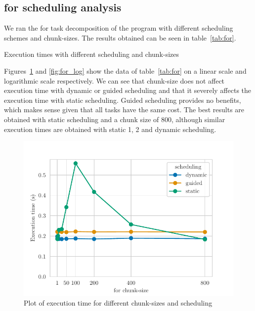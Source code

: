 \pagebreak
\subsection{for scheduling analysis}%
\label{ssec:for}

We ran the for task decomposition of the program with different scheduling schemes and chunk-sizes. The
results obtained can be seen in table~\ref{tab:for}.

\begin{table}[H]
    \caption{Execution times with different scheduling and chunk-sizes}%
    \label{tab:for}
    \begin{center}
    
    \end{center}
\end{table}

Figures~\ref{fig:for} and \ref{fig:for_log} show the data of table~\ref{tab:for} on a linear scale and logarithmic
scale respectively. We can see that chunk-size does not affect execution time with dynamic or guided scheduling
and that it severely affects the execution time with static scheduling. Guided scheduling provides no benefits, which
makes sense given that all tasks have the same cost. The best results are obtained with static scheduling and
a chunk size of 800, although similar execution times are obtained with static 1, 2 and dynamic scheduling.


\begin{figure}[H]
    \centering
    \includegraphics{plots/for-scheduling.pdf}
    \caption{Plot of execution time for different chunk-sizes and scheduling}
    \label{fig:for} 
\end{figure}

